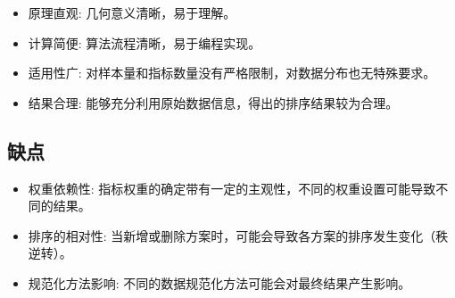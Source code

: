 \begin{itemize}
    \item 原理直观: 几何意义清晰，易于理解。
    \item 计算简便: 算法流程清晰，易于编程实现。
    \item 适用性广: 对样本量和指标数量没有严格限制，对数据分布也无特殊要求。
    \item 结果合理: 能够充分利用原始数据信息，得出的排序结果较为合理。
\end{itemize}

\subsection{缺点}

\begin{itemize}
    \item 权重依赖性: 指标权重的确定带有一定的主观性，不同的权重设置可能导致不同的结果。
    \item 排序的相对性: 当新增或删除方案时，可能会导致各方案的排序发生变化（秩逆转）。
    \item 规范化方法影响: 不同的数据规范化方法可能会对最终结果产生影响。
\end{itemize}